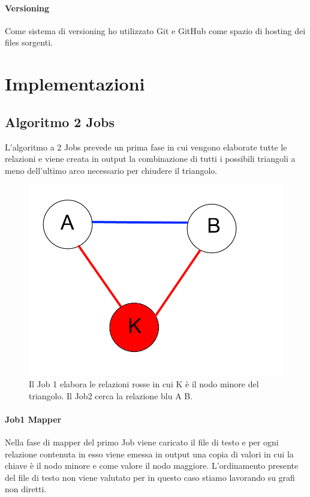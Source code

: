 \documentclass[paper=a4, fontsize=11pt]{scrartcl}	%
\numberwithin{equation}{section}															%
\numberwithin{figure}{section}																%
\numberwithin{table}{section}																%
\begin{document}
\paragraph{Versioning}
Come sistema di versioning ho  utilizzato Git e GitHub come spazio di hosting dei files sorgenti.


\section{Implementazioni}
\subsection{Algoritmo 2 Jobs}
L'algoritmo a 2 Jobs prevede un prima fase in cui vengono elaborate tutte le relazioni e viene creata in output la combinazione di tutti i possibili triangoli a meno dell'ultimo arco necessario per chiudere il triangolo.\\


\begin{figure}[h]
\centering
        \includegraphics[totalheight=6cm]{Graph1.png}
    \caption{Il Job 1 elabora le relazioni rosse in cui K è il nodo minore del triangolo. Il Job2 cerca la relazione blu A B.}
    \label{fig:verticalcell} 
\end{figure}
\paragraph{Job1 Mapper}
Nella fase di mapper del primo Job viene caricato il file di testo e per ogni relazione contenuta in esso viene emessa in output una copia di valori in cui la chiave è il nodo minore e come valore il nodo maggiore. L'ordinamento presente del file di testo non viene valutato per in questo caso stiamo lavorando su grafi non diretti.
\end{document}
